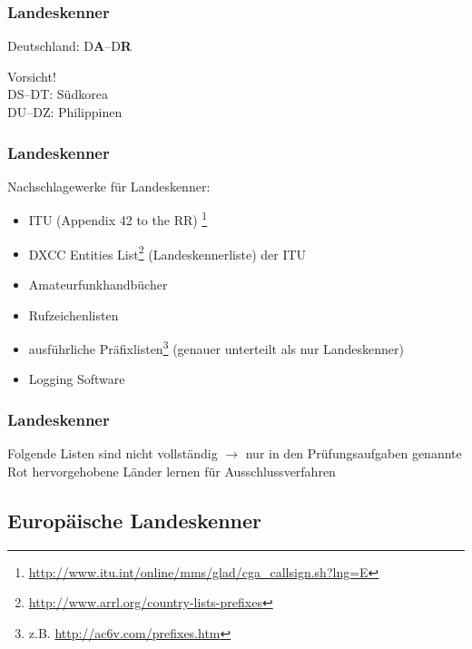 \begin{frame}
  \frametitle{Landeskenner}

  \begin{center}
    Deutschland: D\textbf{A}--D\textbf{R} \\[1em]
  \end{center}

  Vorsicht! \\
  DS--DT: Südkorea \\
  DU--DZ: Philippinen \\[1em]

\end{frame}

\begin{frame}
  \frametitle{Landeskenner}

  Nachschlagewerke für Landeskenner:

  \begin{itemize}
    \item ITU (Appendix 42 to the RR)
      \footnote{\scriptsize\ExternalLink\url{http://www.itu.int/online/mms/glad/cga_callsign.sh?lng=E}}
    \item DXCC Entities List\footnote{\scriptsize\ExternalLink\url{http://www.arrl.org/country-lists-prefixes}}
      (Landeskennerliste) der ITU
    \item Amateurfunkhandbücher
    \item Rufzeichenlisten
    \item ausführliche Präfixlisten\footnote{\scriptsize z.B. \ExternalLink\url{http://ac6v.com/prefixes.htm}}
      (genauer unterteilt als nur Landeskenner)
    \item Logging Software
  \end{itemize}

\end{frame}

\begin{frame}
  \frametitle{Landeskenner}

  Folgende Listen sind nicht vollständig
  $\rightarrow$ nur in den Prüfungsaufgaben genannte \\[3em]

  \alert{Rot hervorgehobene Länder lernen} für Ausschlussverfahren

\end{frame}

\subsection{Europäische Landeskenner}

